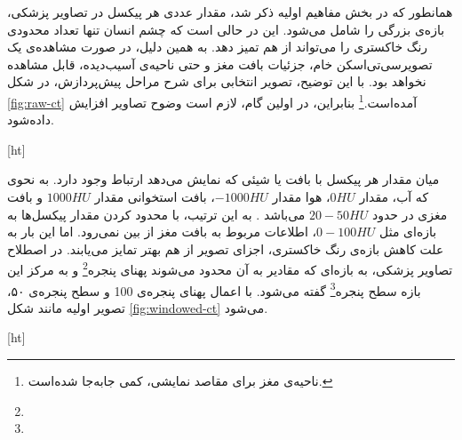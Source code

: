 همانطور که در بخش مفاهیم اولیه ذکر شد، مقدار عددی هر پیکسل در تصاویر پزشکی، بازه‌ی بزرگی را شامل می‌شود.
این در حالی است که چشم انسان تنها تعداد محدودی رنگ خاکستری را می‌تواند از هم تمیز دهد.
به همین دلیل، در صورت مشاهده‌ی یک تصویرسی‌تی‌اسکن خام، جزئیات بافت مغز و حتی ناحیه‌ی آسیب‌دیده، قابل مشاهده نخواهد بود. 
با این توضیح، تصویر انتخابی برای شرح مراحل پیش‌پردازش، در 
شکل \ref{fig:raw-ct} آمده‌است.\footnote{ناحیه‌ی مغز برای مقاصد نمایشی، کمی جا‌به‌جا شده‌است.}
بنابراین، در اولین گام، لازم است وضوح تصاویر افزایش داده‌شود.


[ht]

 میان مقدار هر پیکسل با بافت یا شیئی که نمایش می‌دهد ارتباط وجود دارد.
به نحوی که آب، مقدار $0 HU$، هوا مقدار $-1000 HU$، بافت استخوانی مقدار $1000 HU$ و بافت مغزی در حدود $20-50 HU$ می‌باشد \cite{kamalian2016computed}.
به این ترتیب، با محدود کردن مقدار پیکسل‌ها به بازه‌ای مثل $0-100 HU$، اطلاعات مربوط به بافت مغز از بین نمی‌رود.
اما این بار به علت کاهش بازه‌ی رنگ خاکستری، اجزای تصویر از هم بهتر تمایز می‌یابند.
در اصطلاح تصاویر پزشکی، به بازه‌ای که مقادیر به آن محدود می‌شوند 
پهنای پنجره\footnote{}
و به مرکز این بازه
 سطح پنجره\footnote{} گفته می‌شود.
با اعمال پهنای پنجره‌ی 100 و سطح پنجره‌ی ۵۰، تصویر اولیه مانند شکل 
\ref{fig:windowed-ct}
می‌شود.


[ht]


